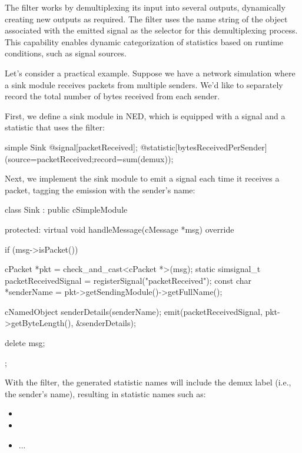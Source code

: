 The  filter works by demultiplexing its input into several
outputs, dynamically creating new outputs as required. The filter uses the name
string of the  object associated with the emitted signal as the
selector for this demultiplexing process. This capability enables dynamic
categorization of statistics based on runtime conditions, such as signal
sources.

Let's consider a practical example. Suppose we have a network simulation
where a sink module receives packets from multiple senders. We'd like to
separately record the total number of bytes received from each sender.

First, we define a sink module in NED, which is equipped with a signal and
a statistic that uses the  filter:

\begin{ned}
simple Sink {
    @signal[packetReceived];
    @statistic[bytesReceivedPerSender](source=packetReceived;record=sum(demux));
}
\end{ned}

Next, we implement the sink module to emit a signal each time it receives a packet,
tagging the emission with the sender's name:

\begin{cpp}
class Sink : public cSimpleModule {
  protected:
    virtual void handleMessage(cMessage *msg) override {
        if (msg->isPacket()) {
            cPacket *pkt = check_and_cast<cPacket *>(msg);
            static simsignal_t packetReceivedSignal = registerSignal("packetReceived");
            const char *senderName = pkt->getSendingModule()->getFullName();

            cNamedObject senderDetails(senderName);
            emit(packetReceivedSignal, pkt->getByteLength(), &senderDetails);

            delete msg;
        }
    }
};
\end{cpp}

With the  filter, the generated statistic names will include
the demux label (i.e., the sender's name), resulting in statistic names such as:

\begin{itemize}
    \item {}
    \item {}
    \item ...
\end{itemize}

